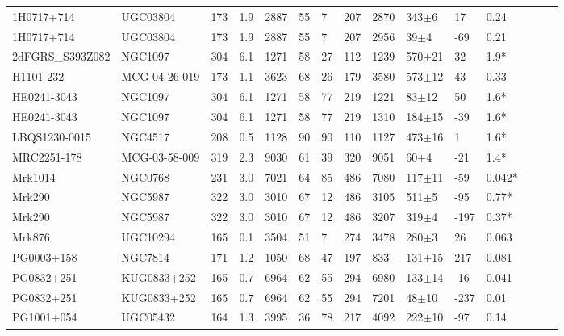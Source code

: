 \documentclass[twocolumn,tighten]{aastex6}
\begin{document}
\begin{table}[ht]
\begin{center}
\begin{tabular}{l l l l l l l l l l l l l l l}
1H0717+714  				&  UGC03804  					&  173  & 1.9 &  2887  	&  55  &  7  	&  207  &  2870  	&  343$\pm$6  		&  17  	&  0.24   \\
1H0717+714  				&  UGC03804  					&  173  & 1.9 &  2887  	&  55  &  7  	&  207  &  2956  	&  39$\pm$4  		&  -69  	&  0.21  \\
2dFGRS\_S393Z082  		&  NGC1097  					&  304  & 6.1 &  1271  	&  58  &  27  	&  112  &  1239  	&  570$\pm$21  	&  32  	&  1.9*  \\
H1101-232  				&  MCG-04-26-019  				&  173  & 1.1 &  3623  	&  68  &  26  	&  179  &  3580  	&  573$\pm$12  	&  43  	&  0.33  \\
HE0241-3043  				&  NGC1097  					&  304  & 6.1 &  1271  	&  58  &  77  	&  219  &  1221  	&  83$\pm$12  		&  50  	&  1.6*  \\
HE0241-3043  				&  NGC1097  					&  304  & 6.1 &  1271  	&  58  &  77  	&  219  &  1310  	&  184$\pm$15  	&  -39  	&  1.6*  \\
LBQS1230-0015  			&  NGC4517  					&  208  & 0.5 &  1128  	&  90  &  90  	&  110  &  1127  	&  473$\pm$16  	&  1  		&  1.6*  \\
MRC2251-178  			&  MCG-03-58-009  				&  319  & 2.3 &  9030  	&  61  &  39  	&  320  &  9051  	&  60$\pm$4  		&  -21  	&  1.4*  \\
Mrk1014  					&  NGC0768  					&  231  & 3.0 &  7021  	&  64  &  85  	&  486  &  7080  	&  117$\pm$11  	&  -59  	&  0.042*  \\
Mrk290  					&  NGC5987  					&  322  & 3.0 &  3010  	&  67  &  12  	&  486  &  3105  	&  511$\pm$5  		&  -95  	&  0.77*  \\
Mrk290  					&  NGC5987  					&  322  & 3.0 &  3010  	&  67  &  12  	&  486  &  3207  	&  319$\pm$4  		&  -197  	&  0.37*  \\
Mrk876  					&  UGC10294  					&  165  & 0.1 &  3504  	&  51  &  7  	&  274  &  3478  	&  280$\pm$3  		&  26  	&  0.063  \\
PG0003+158  				&  NGC7814  					&  171  & 1.2 &  1050  	&  68  &  47  	&  197  &  833  		&  131$\pm$15  	&  217  	&  0.081  \\
PG0832+251  				&  KUG0833+252  				&  165  & 0.7 &  6964  	&  62  &  55  	&  294  &  6980  	&  133$\pm$14  	&  -16  	&  0.041  \\
PG0832+251  				&  KUG0833+252  				&  165  & 0.7 &  6964  	&  62  &  55  	&  294  &  7201  	&  48$\pm$10  		&  -237  	&  0.01  \\
PG1001+054  				&  UGC05432  					&  164  & 1.3 &  3995  	&  36  &  78  	&  217  &  4092  	&  222$\pm$10  	&  -97  	&  0.14  \\

\end{tabular}
\end{center}
\end{table}
\end{document}
